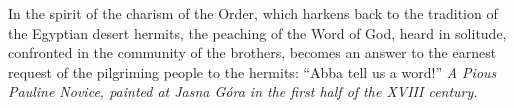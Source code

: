 \pagestyle{empty}
\hspace{0pt}
\vfill

In the spirit of the charism of the Order, which harkens back to the tradition of the Egyptian desert hermits, the peaching of the Word of God, heard in solitude, confronted in the community of the brothers, becomes an answer to the earnest request of the pilgriming people to the hermits: ``Abba tell us a word!''
\vfill
\textit{A Pious Pauline Novice, painted at Jasna Góra in the first half of the XVIII century.}
\hspace{0pt}
\newpage
